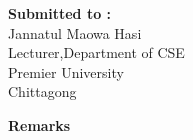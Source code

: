 \documentclass{scrreprt}
\begin{document}
\begin{titlepage}
\begin{minipage}[t]{0.5\textwidth}
        \textbf{Submitted to :}
        \\Jannatul Maowa Hasi
        \\Lecturer,Department of CSE
        \\ Premier University
        \\ Chittagong
    \end{minipage}%
    \begin{minipage}[t]{0.6\textwidth}
        \raggedleft
        \textbf{Remarks}\\
        \vspace{0.5cm} %
    \end{minipage}

    \date{\today}
    \vfill
\end{titlepage}
\newpage
\end{document}
